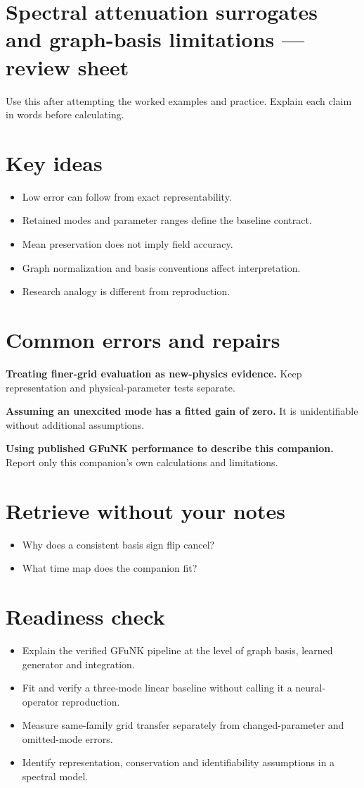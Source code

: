 \documentclass[11pt,letterpaper]{article}
\theoremstyle{definition}\newtheorem{definition}{Definition}\newtheorem{example}{Example}
\numberwithin{equation}{section}
\begin{document}
\section*{Spectral attenuation surrogates and graph-basis limitations --- review sheet}
Use this after attempting the worked examples and practice. Explain each claim in words before calculating.

\section*{Key ideas}
\begin{itemize}
\item Low error can follow from exact representability.
\item Retained modes and parameter ranges define the baseline contract.
\item Mean preservation does not imply field accuracy.
\item Graph normalization and basis conventions affect interpretation.
\item Research analogy is different from reproduction.
\end{itemize}
\section*{Common errors and repairs}
\textbf{Treating finer-grid evaluation as new-physics evidence.} Keep representation and physical-parameter tests separate.

\textbf{Assuming an unexcited mode has a fitted gain of zero.} It is unidentifiable without additional assumptions.

\textbf{Using published GFuNK performance to describe this companion.} Report only this companion's own calculations and limitations.

\section*{Retrieve without your notes}
\begin{itemize}
\item Why does a consistent basis sign flip cancel?
\item What time map does the companion fit?
\end{itemize}
\section*{Readiness check}
\begin{itemize}
\item Explain the verified GFuNK pipeline at the level of graph basis, learned generator and integration.
\item Fit and verify a three-mode linear baseline without calling it a neural-operator reproduction.
\item Measure same-family grid transfer separately from changed-parameter and omitted-mode errors.
\item Identify representation, conservation and identifiability assumptions in a spectral model.
\end{itemize}
\end{document}
